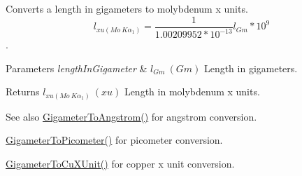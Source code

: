 Converts a length in gigameters to molybdenum x units. \[ l_{xu(Mo\ K\alpha_1)}=\frac{1}{1.00209952*10^{-13}} l_{Gm} * 10^{9}\]. 


\begin{DoxyParams}{Parameters}
{\em length\+In\+Gigameter} & $ l_{Gm}\ (Gm)$ Length in gigameters. \\
\hline
\end{DoxyParams}
\begin{DoxyReturn}{Returns}
$ l_{xu(Mo\ K\alpha_1)}\ (xu)$ Length in molybdenum x units. 
\end{DoxyReturn}
\begin{DoxySeeAlso}{See also}
\mbox{\hyperlink{group___e_g_x_math-_conversions-_length_conversions-_s_i-_gigameter-_non-_s_i_ga622e85e3f663039f3802b29d25655989}{Gigameter\+To\+Angstrom()}} for angstrom conversion. 

\mbox{\hyperlink{group___e_g_x_math-_conversions-_length_conversions-_s_i-_gigameter-_s_i_gae9cea35a0ce747d02ec8b6cf7bfeaa7e}{Gigameter\+To\+Picometer()}} for picometer conversion. 

\mbox{\hyperlink{group___e_g_x_math-_conversions-_length_conversions-_s_i-_gigameter-_non-_s_i_gab542297b31676ef5b3cf62f0c63a6f20}{Gigameter\+To\+Cu\+X\+Unit()}} for copper x unit conversion. 
\end{DoxySeeAlso}
